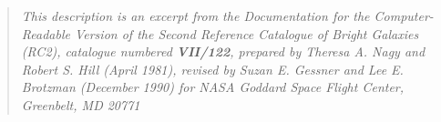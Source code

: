 %
%
%
%
\def\ifhtx{\iffalse}	%

\ifhtx
\cgidef{-cat -bib -tex}
\def\hline{\multicolumn{7}{c}{\hr}\\}
\def\Section#1{\par\thickrule\par\section{#1}}
\else
\def\Section#1{\section{#1}}
\fi
%
\begin{quote} \em This description is an excerpt from the 
{\em Documentation for the Computer-Readable Version of the 
Second Reference Catalogue of Bright Galaxies (RC2)},
catalogue numbered {\bf VII/122},
prepared by Theresa A. Nagy and Robert S. Hill (April 1981),
revised by Suzan E. Gessner and Lee E. Brotzman (December 1990)
for NASA Goddard Space Flight Center, Greenbelt, MD 20771
\end{quote}

\tableofcontents

